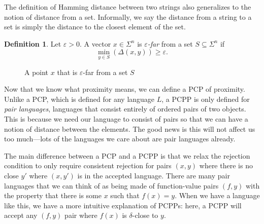 \documentclass[english,12pt]{reedthesis}
\theoremstyle{plain}
\theoremstyle{definition}
\newtheorem{defn}[defn]{Definition}
\theoremstyle{remark}
\begin{document}
The definition of Hamming distance between two strings also generalizes to the
notion of distance from a set. Informally, we say the distance from a string to
a set is simply the distance to the closest element of the set.

\begin{defn}\label{def:far}
  Let $\varepsilon > 0$. A vector $x \in \Sigma^{n}$ is \emph{$\varepsilon$-far} from a set $S \subseteq \Sigma^{n}$ if
  \[
    \min_{y \in S}(\Delta(x, y)) \ge \varepsilon.
  \]
\end{defn}

\begin{figure}[htbp]
  \centering
  \caption{A point $x$ that is $\varepsilon$-far from a set $S$}\label{fig:epsilon-far}
\end{figure}

Now that we know what proximity means, we can define a PCP of proximity. Unlike
a PCP, which is defined for any language $L$, a PCPP is only defined for
\emph{pair languages}, languages that consist entirely of
ordered pairs of two objects. This is because we need our language to consist of
pairs so that we can have a notion of distance between the elements. The good
news is this will not affect us too much---lots of the languages we care about are
pair languages already.

The main difference between a PCP and a PCPP is that we relax the rejection
condition to only require consistent rejection for pairs $(x, y)$ where there is
no close $y'$ where $(x, y')$ is in the accepted language. There are many pair
languages that we can think of as being made of function-value pairs $(f, y)$
with the property that there is some $x$ such that $f(x) = y$. When we have a
language like this, we have a more intuitive explanation of PCPPs: here, a PCPP
will accept any $(f, y)$ pair where $f(x)$ is $\delta$-close to $y$.
\end{document}
